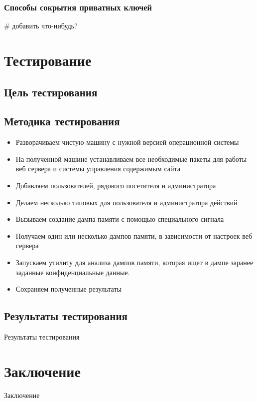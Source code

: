 \documentclass[20pt]{article}
\begin{document}
\subsubsection{Способы сокрытия приватных ключей}
\# добавить что-нибудь?

\newpage

\section{Тестирование}

\subsection{Цель тестирования}

\subsection{Методика тестирования}

\begin{itemize}
  \item Разворачиваем чистую машину с нужной версией операционной системы
  \item На полученной машине устанавливаем все необходимые пакеты для работы
  веб сервера и системы управления содержимым сайта
  \item Добавляем пользователей, рядового посетителя и администратора
  \item Делаем несколько типовых для пользователя и администратора действий
  \item Вызываем создание дампа памяти с помощью специального сигнала
  \item Получаем один или несколько дампов памяти, в зависимости от настроек
  веб сервера
  \item Запускаем утилиту для анализа дампов памяти, которая ищет в дампе
  заранее заданные конфиденциальные данные.
  \item Сохраняем полученные результаты
\end{itemize}

\subsection{Результаты тестирования}
Результаты тестирования

\newpage

\section{Заключение}
Заключение



\end{document}
